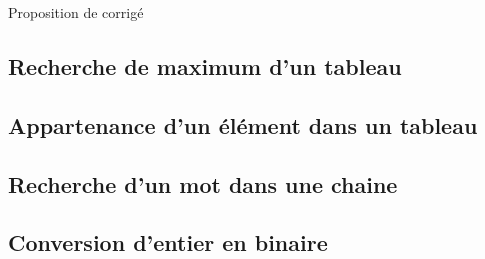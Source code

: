 
\vspace{0.1cm}
\begin{huge}
 Proposition de corrigé
\end{huge}

\subsection{Recherche de maximum d'un tableau}
\setcounter{thequestion}{0}
\subsection{Appartenance d'un élément dans un tableau}
\setcounter{thequestion}{0}
\subsection{Recherche d'un mot dans une chaine}
\setcounter{thequestion}{0}
\subsection{Conversion d'entier en binaire}
\setcounter{thequestion}{0}
